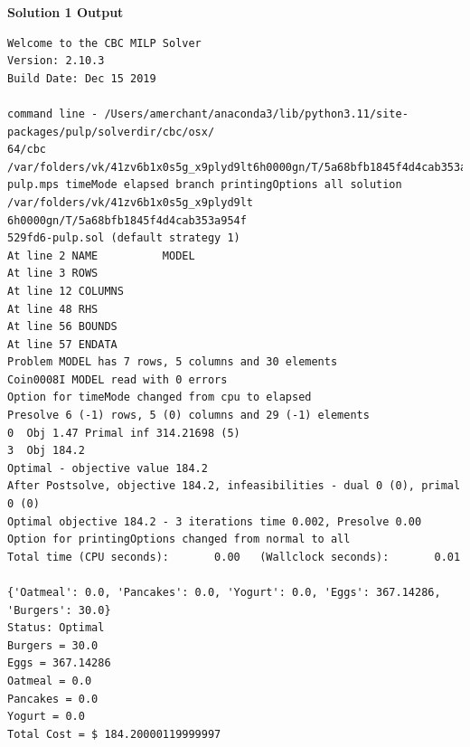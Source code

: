\documentclass{article}
\begin{document}
\textbf{Solution 1 Output}
\label{Solution1 Output}
\begin{lstlisting}[basicstyle=\small]
Welcome to the CBC MILP Solver 
Version: 2.10.3 
Build Date: Dec 15 2019 

command line - /Users/amerchant/anaconda3/lib/python3.11/site-packages/pulp/solverdir/cbc/osx/
64/cbc /var/folders/vk/41zv6b1x0s5g_x9plyd9lt6h0000gn/T/5a68bfb1845f4d4cab353a954f529fd6-
pulp.mps timeMode elapsed branch printingOptions all solution /var/folders/vk/41zv6b1x0s5g_x9plyd9lt
6h0000gn/T/5a68bfb1845f4d4cab353a954f
529fd6-pulp.sol (default strategy 1)
At line 2 NAME          MODEL
At line 3 ROWS
At line 12 COLUMNS
At line 48 RHS
At line 56 BOUNDS
At line 57 ENDATA
Problem MODEL has 7 rows, 5 columns and 30 elements
Coin0008I MODEL read with 0 errors
Option for timeMode changed from cpu to elapsed
Presolve 6 (-1) rows, 5 (0) columns and 29 (-1) elements
0  Obj 1.47 Primal inf 314.21698 (5)
3  Obj 184.2
Optimal - objective value 184.2
After Postsolve, objective 184.2, infeasibilities - dual 0 (0), primal 0 (0)
Optimal objective 184.2 - 3 iterations time 0.002, Presolve 0.00
Option for printingOptions changed from normal to all
Total time (CPU seconds):       0.00   (Wallclock seconds):       0.01

{'Oatmeal': 0.0, 'Pancakes': 0.0, 'Yogurt': 0.0, 'Eggs': 367.14286, 'Burgers': 30.0}
Status: Optimal
Burgers = 30.0
Eggs = 367.14286
Oatmeal = 0.0
Pancakes = 0.0
Yogurt = 0.0
Total Cost = $ 184.20000119999997
\end{lstlisting}
\end{document}
